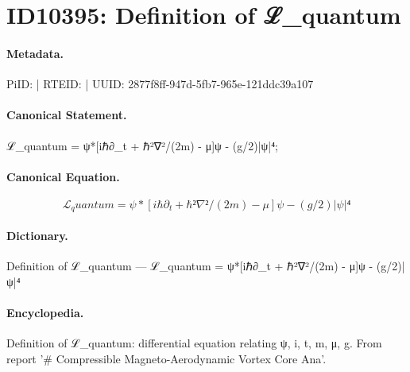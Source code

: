 \section*{ID10395: Definition of ℒ\_quantum}
\paragraph{Metadata.}
PiID:  | RTEID:  | UUID: 2877f8ff-947d-5fb7-965e-121ddc39a107

\paragraph{Canonical Statement.}
ℒ\_quantum = ψ*[iℏ∂\_t + ℏ²∇²/(2m) - μ]ψ - (g/2)|ψ|⁴;

\paragraph{Canonical Equation.}
\[
ℒ_quantum = ψ*[iℏ∂_t + ℏ²∇²/(2m) - μ]ψ - (g/2)|ψ|⁴
\]

\paragraph{Dictionary.}
Definition of ℒ\_quantum — ℒ\_quantum = ψ*[iℏ∂\_t + ℏ²∇²/(2m) - μ]ψ - (g/2)|ψ|⁴

\paragraph{Encyclopedia.}
Definition of ℒ\_quantum: differential equation relating ψ, i, t, m, μ, g. From report '\# Compressible Magneto-Aerodynamic Vortex Core Ana'.
